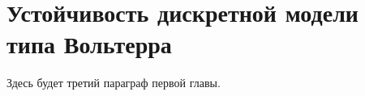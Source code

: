 \section{ Устойчивость дискретной модели типа Вольтерра} \label{p13}

Здесь будет третий параграф первой главы.